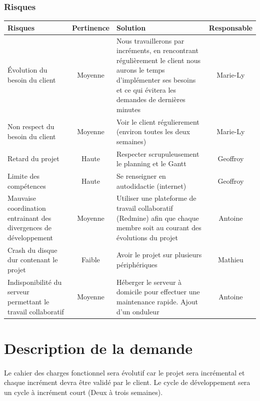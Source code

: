 \documentclass[12pt,a4paper,openany]{article}
\begin{document}
		\subsubsection{Risques}
		\begin{center}
		\begin{tabular}{|p{5.5cm}|c|p{6.5cm}|c|}
				\hline
				\textbf{Risques} & \textbf{Pertinence} & \textbf{Solution} & \textbf{Responsable} \\
				\hline
				Évolution du besoin du client & Moyenne &  Nous travaillerons par incréments, 
				en rencontrant régulièrement le client  nous aurons le temps d'implémenter ses besoins et 
				ce qui évitera les demandes de dernières minutes & Marie-Ly \\ 
				\hline
				Non respect du besoin du client & Moyenne & Voir le client régulierement (environ toutes les deux semaines) & Marie-Ly\\ 
				\hline
				Retard du projet & Haute & Respecter scrupuleusement le planning et le Gantt & Geoffroy\\
				\hline
				Limite des compétences & Haute & Se renseigner en autodidactie (internet)& Geoffroy\\ 
				\hline
				Mauvaise coordination entrainant des divergences de développement& Moyenne & Utiliser une plateforme de travail collaboratif (Redmine) afin que
				chaque membre soit au courant des évolutions du projet & Antoine \\
				\hline
				Crash du disque dur contenant le projet & Faible& Avoir le projet sur plusieurs périphériques & Mathieu\\ \hline
				Indisponibilité du serveur permettant le travail collaboratif & Moyenne & Héberger le serveur à domicile pour effectuer une maintenance rapide.
				Ajout d'un onduleur & Antoine  \\
				\hline
			\end{tabular}
		\end{center}	
	\section{Description de la demande}
	\paragraph{}
		Le cahier des charges fonctionnel sera évolutif car le projet sera incrémental et chaque incrément devra 
		être validé par le client. Le cycle de développement sera un cycle à incrément court (Deux à trois semaines).
\end{document}
